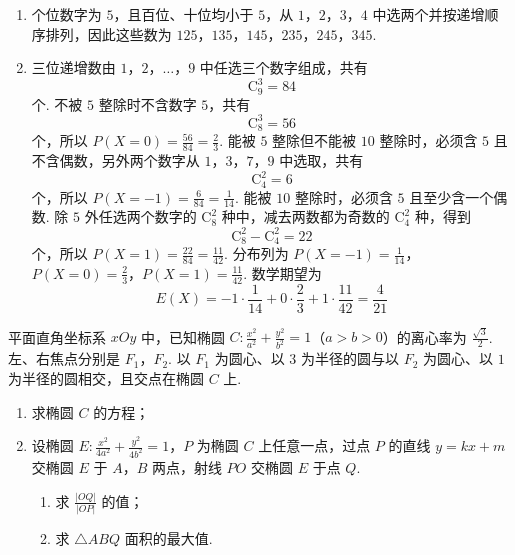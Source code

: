\begin{solution}
\begin{enumerate}
\item 个位数字为 \(5\)，且百位、十位均小于 \(5\)，从 \(1\)，\(2\)，\(3\)，\(4\) 中选两个并按递增顺序排列，因此这些数为
\(125\)，\(135\)，\(145\)，\(235\)，\(245\)，\(345\).
\item 三位递增数由 \(1\)，\(2\)，\(\ldots\)，\(9\) 中任选三个数字组成，共有
\[
\mathrm C_9^3=84
\]
个. 不被 \(5\) 整除时不含数字 \(5\)，共有
\[
\mathrm C_8^3=56
\]
个，所以 \(P(X=0)=\frac{56}{84}=\frac23\).
能被 \(5\) 整除但不能被 \(10\) 整除时，必须含 \(5\) 且不含偶数，另外两个数字从 \(1\)，\(3\)，\(7\)，\(9\) 中选取，共有
\[
\mathrm C_4^2=6
\]
个，所以 \(P(X=-1)=\frac6{84}=\frac1{14}\).
能被 \(10\) 整除时，必须含 \(5\) 且至少含一个偶数. 除 \(5\) 外任选两个数字的 \(\mathrm C_8^2\) 种中，减去两数都为奇数的 \(\mathrm C_4^2\) 种，得到
\[
\mathrm C_8^2-\mathrm C_4^2=22
\]
个，所以 \(P(X=1)=\frac{22}{84}=\frac{11}{42}\). 分布列为
\(P(X=-1)=\frac1{14}\)，\(P(X=0)=\frac23\)，\(P(X=1)=\frac{11}{42}\).
数学期望为
\[
E(X)=-1\cdot\frac1{14}+0\cdot\frac23+1\cdot\frac{11}{42}=\frac4{21}
\]
\end{enumerate}
\end{solution}

\begin{problem}
平面直角坐标系 \(xOy\) 中，已知椭圆 \(C: \frac{x^2}{a^2} + \frac{y^2}{b^2} = 1\)（\(a > b > 0\)）的离心率为 \(\frac{\sqrt{3}}{2}\). 左、右焦点分别是 \(F_1\)，\(F_2\). 以 \(F_1\) 为圆心、以 \(3\) 为半径的圆与以 \(F_2\) 为圆心、以 \(1\) 为半径的圆相交，且交点在椭圆 \(C\) 上.
\begin{enumerate}
\item 求椭圆 \(C\) 的方程；
\item 设椭圆 \(E: \frac{x^2}{4a^2} + \frac{y^2}{4b^2} = 1\)，\(P\) 为椭圆 \(C\) 上任意一点，过点 \(P\) 的直线 \(y = kx + m\) 交椭圆 \(E\) 于 \(A\)，\(B\) 两点，射线 \(PO\) 交椭圆 \(E\) 于点 \(Q\).
\begin{enumerate}
\item 求 \(\frac{|OQ|}{|OP|}\) 的值；
\item 求 \(\triangle ABQ\) 面积的最大值.
\end{enumerate}
\end{enumerate}
\end{problem}

